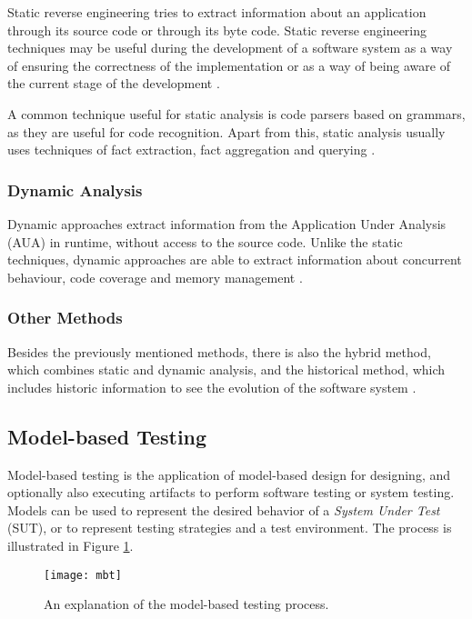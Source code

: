 Static reverse engineering tries to extract information about an application through its source code or through its byte code. Static reverse engineering techniques may be useful during the development of a software system as a way of ensuring the correctness of the implementation or as a way of being aware of the current stage of the development \cite{systa2000static}.

A common technique useful for static analysis is code parsers based on grammars, as they are useful for code recognition. Apart from this, static analysis usually uses techniques of fact extraction, fact aggregation and querying \cite{telea2009querying, telea2008interactive}. 

\subsubsection{Dynamic Analysis}

Dynamic approaches extract information from the Application Under Analysis (AUA) in runtime, without access to the source code. Unlike the static techniques, dynamic approaches are able to extract information about concurrent behaviour, code coverage and memory management \cite{systa1999dynamic}.

\subsubsection{Other Methods}

Besides the previously mentioned methods, there is also the hybrid method, which combines static and dynamic analysis, and the historical method, which includes historic information to see the evolution of the software system \cite{canfora2011achievements}.

\subsection{Model-based Testing}

Model-based testing is the application of model-based design for designing, and optionally also executing artifacts to perform software testing or system testing. Models can be used to represent the desired behavior of a \textit{System Under Test} (SUT), or to represent testing strategies and a test environment. The process is illustrated in Figure \ref{fig:mbt}.

\begin{figure}[!htb]
\centering
\texttt{[image: mbt]}
\caption{An explanation of the model-based testing process.}
\label{fig:mbt}
\end{figure}

